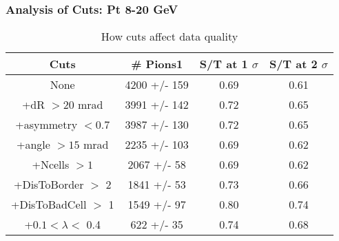 \frame
{
\frametitle{Analysis of Cuts: Pt 8-20 GeV}
\begin{table}
\caption{How cuts affect data quality}
\centering
\begin{tabular}{c c c c}
\hline\hline
Cuts & \# Pions1 & S/T at 1 $\sigma$ & S/T at 2 $\sigma$ \\ [0.5ex]
\hline
None & 4200 +/-  159 & 0.69 & 0.61 \\ %
+dR $> 20$ mrad & 3991 +/-  142 & 0.72 & 0.65 \\ %
+asymmetry $< 0.7$ & 3987 +/-  130 & 0.72 & 0.65 \\ %
+angle $> 15$ mrad & 2235 +/-  103 & 0.69 & 0.62 \\ %
+Ncells $> 1$& 2067 +/-   58 & 0.69 & 0.62 \\ %
+DisToBorder $>$ 2 & 1841 +/-   53 & 0.73 & 0.66 \\ %
+DisToBadCell $>$ 1& 1549 +/-   97 & 0.80 & 0.74 \\ %
+$0.1 < \lambda <$ 0.4 &  622 +/-   35 & 0.74 & 0.68 \\ %
[1ex]
\hline
\end{tabular}
\label{table:nonlin}
\end{table}
}
